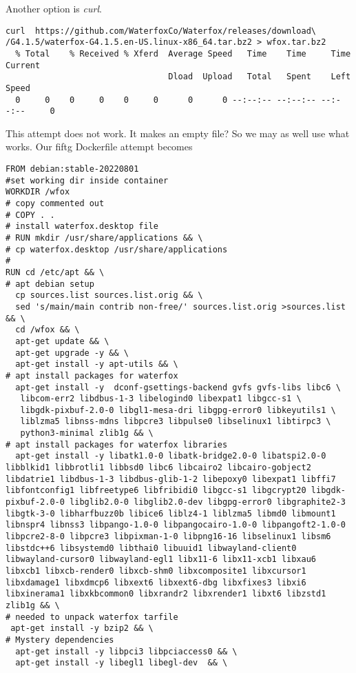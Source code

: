 \documentclass{article}  %
\begin{document}
 Another option is {\em curl}.
\begin{verbatim}
curl  https://github.com/WaterfoxCo/Waterfox/releases/download\
/G4.1.5/waterfox-G4.1.5.en-US.linux-x86_64.tar.bz2 > wfox.tar.bz2
  % Total    % Received % Xferd  Average Speed   Time    Time     Time  Current
                                 Dload  Upload   Total   Spent    Left  Speed
  0     0    0     0    0     0      0      0 --:--:-- --:--:-- --:--:--     0
\end{verbatim}
This attempt does not work. It makes an empty file?
So we may as well use what works. Our fiftg Dockerfile attempt becomes
\begin{verbatim}
FROM debian:stable-20220801
#set working dir inside container
WORKDIR /wfox
# copy commented out 
# COPY . .
# install waterfox.desktop file
# RUN mkdir /usr/share/applications && \
# cp waterfox.desktop /usr/share/applications
#
RUN cd /etc/apt && \
# apt debian setup
  cp sources.list sources.list.orig && \
  sed 's/main/main contrib non-free/' sources.list.orig >sources.list && \
  cd /wfox && \
  apt-get update && \
  apt-get upgrade -y && \
  apt-get install -y apt-utils && \
# apt install packages for waterfox
  apt-get install -y  dconf-gsettings-backend gvfs gvfs-libs libc6 \
   libcom-err2 libdbus-1-3 libelogind0 libexpat1 libgcc-s1 \
   libgdk-pixbuf-2.0-0 libgl1-mesa-dri libgpg-error0 libkeyutils1 \
   liblzma5 libnss-mdns libpcre3 libpulse0 libselinux1 libtirpc3 \
   python3-minimal zlib1g && \
# apt install packages for waterfox libraries
  apt-get install -y libatk1.0-0 libatk-bridge2.0-0 libatspi2.0-0 libblkid1 libbrotli1 libbsd0 libc6 libcairo2 libcairo-gobject2 libdatrie1 libdbus-1-3 libdbus-glib-1-2 libepoxy0 libexpat1 libffi7 libfontconfig1 libfreetype6 libfribidi0 libgcc-s1 libgcrypt20 libgdk-pixbuf-2.0-0 libglib2.0-0 libglib2.0-dev libgpg-error0 libgraphite2-3 libgtk-3-0 libharfbuzz0b libice6 liblz4-1 liblzma5 libmd0 libmount1 libnspr4 libnss3 libpango-1.0-0 libpangocairo-1.0-0 libpangoft2-1.0-0 libpcre2-8-0 libpcre3 libpixman-1-0 libpng16-16 libselinux1 libsm6 libstdc++6 libsystemd0 libthai0 libuuid1 libwayland-client0 libwayland-cursor0 libwayland-egl1 libx11-6 libx11-xcb1 libxau6 libxcb1 libxcb-render0 libxcb-shm0 libxcomposite1 libxcursor1 libxdamage1 libxdmcp6 libxext6 libxext6-dbg libxfixes3 libxi6 libxinerama1 libxkbcommon0 libxrandr2 libxrender1 libxt6 libzstd1 zlib1g && \
# needed to unpack waterfox tarfile
 apt-get install -y bzip2 && \
# Mystery dependencies
  apt-get install -y libpci3 libpciaccess0 && \
  apt-get install -y libegl1 libegl-dev  && \

\end{verbatim}
\end{document}
